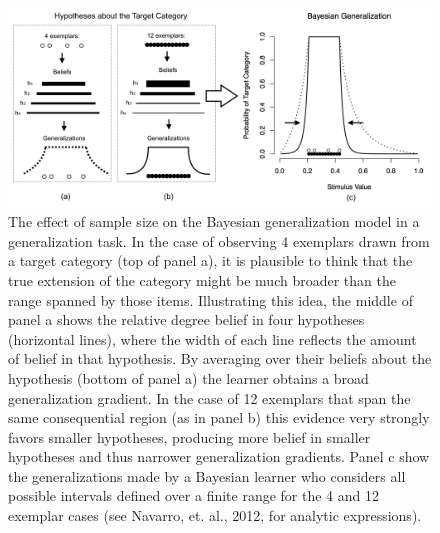 \documentclass[doc,apacite]{apa6}
\begin{document}
\begin{figure}[t]
\begin{center}
\includegraphics[scale=.4]{figures/Bayes-gen.png}
\caption{The effect of sample size on the Bayesian generalization model in a generalization task. In the case of observing 4 exemplars drawn from a target category (top of panel a), it is plausible to think that the true extension of the category might be much broader than the range spanned by those items. Illustrating this idea, the middle of panel a shows the relative degree belief in four hypotheses (horizontal lines), where the width of each line reflects the amount of belief in that hypothesis. By averaging over their beliefs about the hypothesis (bottom of panel a) the learner obtains a broad generalization gradient. In the case of 12 exemplars that span the same consequential region (as in panel b) this evidence very strongly favors smaller hypotheses, producing more belief in smaller hypotheses and thus narrower generalization gradients. Panel c show the generalizations made by a Bayesian learner who considers all possible intervals defined over a finite range for the 4 and 12 exemplar cases (see Navarro, et. al., 2012, for analytic expressions).}
\label{fig:bayesExample}
\end{center}
\end{figure}
\end{document}
